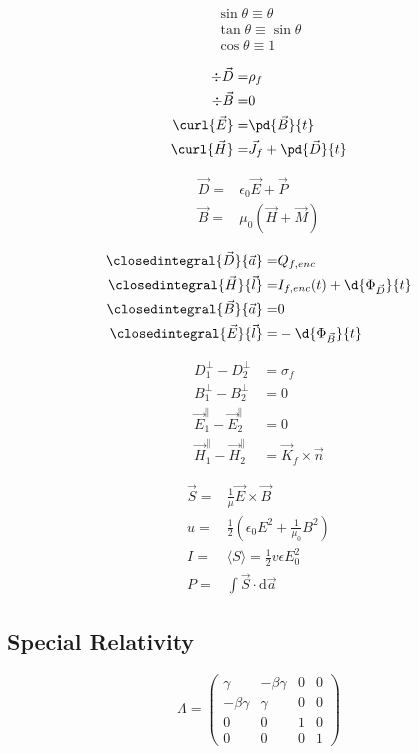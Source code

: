 \begin{align*}
	\sin\theta\equiv\theta\\
	\tan\theta\equiv\sin\theta\\
	\cos\theta\equiv1
\end{align*}

\begin{align*}
    \div{\vec{D}} =& \rho_{f} \\
    \div{\vec{B}} =& 0 \\
    \curl{\vec{E}} =& \pd{\vec{B}}{t} \\
    \curl{\vec{H}} =& \vec{J}_{f} + \pd{\vec{D}}{t}
\end{align*}

\begin{align*}
    \vec{D} =& \epsilon_{0}\vec{E} + \vec{P} \\
    \vec{B} =& \mu_{0}(\vec{H} + \vec{M})
\end{align*}

\begin{align*}
    \closedintegral{\vec{D}}{\vec{a}} =& Q_{f,enc} \\
    \closedintegral{\vec{H}}{\vec{l}} =& I_{f,enc}(t) + \d{\Phi_{\vec{D}}}{t} \\
    \closedintegral{\vec{B}}{\vec{a}} =& 0\\
    \closedintegral{\vec{E}}{\vec{l}} =& - \d{\Phi_{\vec{B}}}{t}
\end{align*}

\begin{align*}
    D_{1}^{\perp} - D_{2}^{\perp} &= \sigma_{f} \\
    B_{1}^{\perp} - B_{2}^{\perp} &= 0 \\
    \vec{E}_{1}^{\parallel} - \vec{E}_{2}^{\parallel} &= 0 \\
    \vec{H}_{1}^{\parallel} - \vec{H}_{2}^{\parallel} &= \vec{K}_f \times \hat{\vec{n}}
\end{align*}

\begin{align*}
    \vec{S} =& \frac{1}{\mu} \vec{E} \times \vec{B} \\
    u =& \frac{1}{2} \left( \epsilon_0 E^{2} + \frac{1}{\mu_0} B^{2} \right) \\
    I =& \langle S \rangle = \frac{1}{2} v\epsilon E_{0}^{2} \\
    P =& \int \vec{S} \cdot \mathrm{d}\vec{a}
\end{align*}

\subsection{Special Relativity}
\begin{equation*}
    \Lambda =
    \begin{pmatrix}
        \gamma & -\beta\gamma & 0 & 0 \\
        -\beta\gamma & \gamma & 0 & 0 \\
        0 & 0 & 1 & 0 \\
        0 & 0 & 0 & 1
    \end{pmatrix}
\end{equation*}

